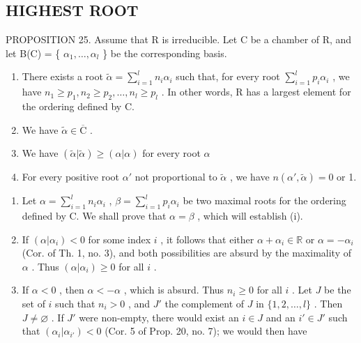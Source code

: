\subsection{HIGHEST ROOT}

PROPOSITION 25. Assume that R is irreducible. Let C be a chamber of R, and let B(C) = \{ \(\alpha_{1}, \ldots, \alpha_{l}\) \} be the corresponding basis.

\begin{enumerate}
\def\labelenumi{(\roman{enumi})}
\item
  There exists a root \(\tilde{\alpha} = \sum_{i=1}^{l} n_i \alpha_i\) such that, for every root \(\sum_{i=1}^{l} p_i \alpha_i\) , we have \(n_1 \geqslant p_1, n_2 \geqslant p_2, \ldots, n_l \geqslant p_l\) . In other words, R has a largest element for the ordering defined by C.
\item
  We have \(\tilde{\alpha} \in \overline{\mathrm{C}}\) .
\item
  We have \((\tilde{\alpha}|\tilde{\alpha})\geqslant (\alpha |\alpha)\) for every root \(\alpha\)
\item
  For every positive root \(\alpha'\) not proportional to \(\tilde{\alpha}\) , we have \(n(\alpha', \tilde{\alpha}) = 0\) or 1.
\end{enumerate}

\begin{enumerate}
\def\labelenumi{\arabic{enumi})}
\item
  Let \(\alpha = \sum_{i=1}^{l} n_i \alpha_i\) , \(\beta = \sum_{i=1}^{l} p_i \alpha_i\) be two maximal roots for the ordering defined by C. We shall prove that \(\alpha = \beta\) , which will establish (i).
\item
  If \((\alpha | \alpha_i) < 0\) for some index \(i\) , it follows that either \(\alpha + \alpha_i \in \mathbb{R}\) or \(\alpha = -\alpha_i\) (Cor. of Th. 1, no. 3), and both possibilities are absurd by the maximality of \(\alpha\) . Thus \((\alpha | \alpha_i) \geqslant 0\) for all \(i\) .
\item
  If \(\alpha < 0\) , then \(\alpha < -\alpha\) , which is absurd. Thus \(n_i \geqslant 0\) for all \(i\) . Let \(J\) be the set of \(i\) such that \(n_i > 0\) , and \(J'\) the complement of \(J\) in \(\{1, 2, \ldots, l\}\) . Then \(J \neq \varnothing\) . If \(J'\) were non-empty, there would exist an \(i \in J\) and an \(i' \in J'\) such that \((\alpha_i | \alpha_{i'}) < 0\) (Cor. 5 of Prop. 20, no. 7); we would then have
\end{enumerate}

